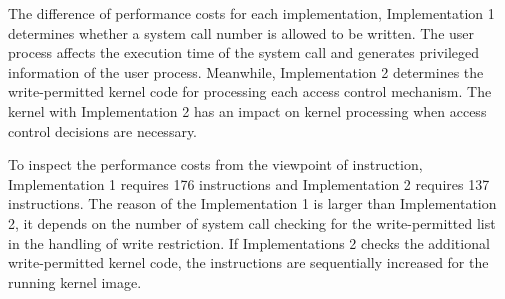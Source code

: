 %
The difference of performance costs for each implementation, Implementation 1
determines whether a system call number is allowed to be written. 
The user process affects the execution time of the system call and generates
privileged information of the user process.
%
Meanwhile, Implementation 2 determines the write-permitted kernel code for
processing each access control mechanism. 
%
The kernel with Implementation 2 has an impact on kernel processing when access
control decisions are necessary.
%
%

%  

To inspect the performance costs from the viewpoint of instruction,
Implementation 1 requires 176 instructions and Implementation 2 requires 137
instructions.
%
The reason of the Implementation 1 is larger than Implementation 2,  
it depends on the number of system call checking for the write-permitted list in
the handling of write restriction.
%
If Implementations 2 checks the additional write-permitted kernel code, the
instructions are sequentially increased for the running kernel image.

%


